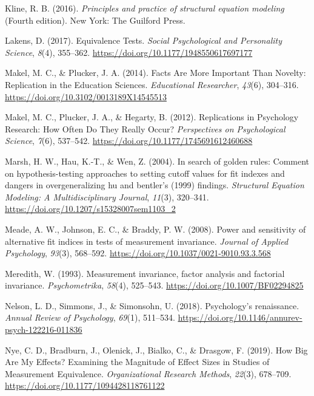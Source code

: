 \documentclass[
  man]{apa6}
\newlength{\cslhangindent}
\newlength{\cslentryspacingunit} %
\newenvironment{CSLReferences}[2] %
 {%
  \setlength{\parindent}{0pt}
  \ifodd #1
  \let\oldpar\par
  \def\par{\hangindent=\cslhangindent\oldpar}
  \fi
  \setlength{\parskip}{#2\cslentryspacingunit}
 }%
 {}
\begin{document}
\begin{CSLReferences}{1}{0}
\leavevmode{}%
Kline, R. B. (2016). \emph{Principles and practice of structural equation modeling} (Fourth edition). New York: The Guilford Press.

\leavevmode{}%
Lakens, D. (2017). Equivalence Tests. \emph{Social Psychological and Personality Science}, \emph{8}(4), 355--362. \url{https://doi.org/10.1177/1948550617697177}

\leavevmode{}%
Makel, M. C., \& Plucker, J. A. (2014). Facts Are More Important Than Novelty: Replication in the Education Sciences. \emph{Educational Researcher}, \emph{43}(6), 304--316. \url{https://doi.org/10.3102/0013189X14545513}

\leavevmode{}%
Makel, M. C., Plucker, J. A., \& Hegarty, B. (2012). Replications in Psychology Research: How Often Do They Really Occur? \emph{Perspectives on Psychological Science}, \emph{7}(6), 537--542. \url{https://doi.org/10.1177/1745691612460688}

\leavevmode{}%
Marsh, H. W., Hau, K.-T., \& Wen, Z. (2004). In search of golden rules: Comment on hypothesis-testing approaches to setting cutoff values for fit indexes and dangers in overgeneralizing hu and bentler's (1999) findings. \emph{Structural Equation Modeling: A Multidisciplinary Journal}, \emph{11}(3), 320--341. \url{https://doi.org/10.1207/s15328007sem1103_2}

\leavevmode{}%
Meade, A. W., Johnson, E. C., \& Braddy, P. W. (2008). Power and sensitivity of alternative fit indices in tests of measurement invariance. \emph{Journal of Applied Psychology}, \emph{93}(3), 568--592. \url{https://doi.org/10.1037/0021-9010.93.3.568}

\leavevmode{}%
Meredith, W. (1993). Measurement invariance, factor analysis and factorial invariance. \emph{Psychometrika}, \emph{58}(4), 525--543. \url{https://doi.org/10.1007/BF02294825}

\leavevmode{}%
Nelson, L. D., Simmons, J., \& Simonsohn, U. (2018). Psychology's renaissance. \emph{Annual Review of Psychology}, \emph{69}(1), 511--534. \url{https://doi.org/10.1146/annurev-psych-122216-011836}

\leavevmode{}%
Nye, C. D., Bradburn, J., Olenick, J., Bialko, C., \& Drasgow, F. (2019). How Big Are My Effects? Examining the Magnitude of Effect Sizes in Studies of Measurement Equivalence. \emph{Organizational Research Methods}, \emph{22}(3), 678--709. \url{https://doi.org/10.1177/1094428118761122}


\end{CSLReferences}
\end{document}
